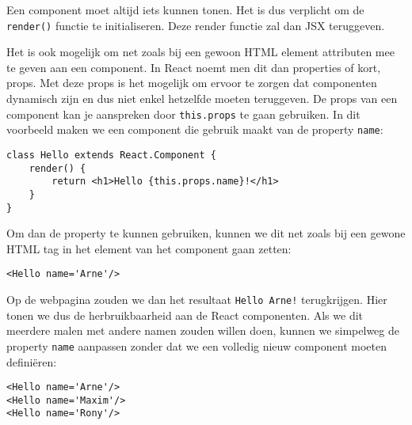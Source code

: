 Een component moet altijd iets kunnen tonen. Het is dus verplicht om de \lstinline[basicstyle=\ttfamily\color{red}]|render()| functie te initialiseren. Deze render functie zal dan JSX teruggeven.

Het is ook mogelijk om net zoals bij een gewoon HTML element attributen mee te geven aan een component. In React noemt men dit dan properties of kort, props. Met deze props is het mogelijk om ervoor te zorgen dat componenten dynamisch zijn en dus niet enkel hetzelfde moeten teruggeven. De props van een component kan je aanspreken door \lstinline[basicstyle=\ttfamily\color{red}]|this.props| te gaan gebruiken. In dit voorbeeld maken we een component die gebruik maakt van de property \lstinline[basicstyle=\ttfamily\color{red}]|name|:

\begin{lstlisting}[frame=single, caption=Het component Hello wordt gedefinieerd die de property 'name' gebruikt]
class Hello extends React.Component {
	render() {
		return <h1>Hello {this.props.name}!</h1>
	}
}
\end{lstlisting}

Om dan de property te kunnen gebruiken, kunnen we dit net zoals bij een gewone HTML tag in het element van het component gaan zetten:

\begin{lstlisting}[frame=single, caption=Het component Hello met de property name]
<Hello name='Arne'/>
\end{lstlisting}

Op de webpagina zouden we dan het resultaat \lstinline[basicstyle=\ttfamily\color{red}]|Hello Arne!| terugkrijgen. Hier tonen we dus de herbruikbaarheid aan de React componenten. Als we dit meerdere malen met andere namen zouden willen doen, kunnen we simpelweg de property \lstinline[basicstyle=\ttfamily\color{red}]|name| aanpassen zonder dat we een volledig nieuw component moeten definiëren:

\begin{lstlisting}[frame=single, caption=Het component Hello die meerdere malen met andere props wordt gebruikt.]
<Hello name='Arne'/>
<Hello name='Maxim'/>
<Hello name='Rony'/>
\end{lstlisting}


